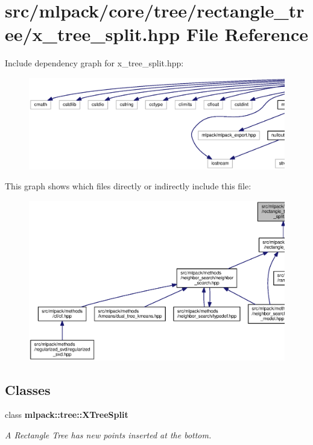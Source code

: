 \section{src/mlpack/core/tree/rectangle\+\_\+tree/x\+\_\+tree\+\_\+split.hpp File Reference}
\label{x__tree__split_8hpp}
Include dependency graph for x\+\_\+tree\+\_\+split.\+hpp\+:
\nopagebreak
\begin{figure}[H]
\begin{center}
\leavevmode
\includegraphics[width=350pt]{x__tree__split_8hpp__incl}
\end{center}
\end{figure}
This graph shows which files directly or indirectly include this file\+:
\nopagebreak
\begin{figure}[H]
\begin{center}
\leavevmode
\includegraphics[width=350pt]{x__tree__split_8hpp__dep__incl}
\end{center}
\end{figure}
\subsection*{Classes}
\begin{DoxyCompactItemize}
\item 
class {\bf mlpack\+::tree\+::\+X\+Tree\+Split}
\begin{DoxyCompactList}\small\item\em A Rectangle Tree has new points inserted at the bottom. \end{DoxyCompactList}\end{DoxyCompactItemize}
